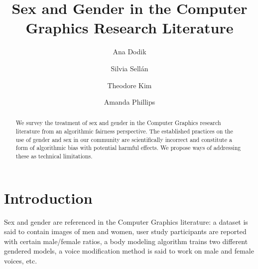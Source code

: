 \documentclass[nonacm,sigconf,review,balance=false]{acmart}
\begin{document}
\title{Sex and Gender in the Computer Graphics Research Literature}

\author{Ana Dodik}

\author{Silvia Sellán}\authornotemark[1]

\author{Theodore Kim}

\author{Amanda Phillips}



\begin{abstract}
    We survey the treatment of sex and gender in the Computer Graphics research
    literature from an algorithmic fairness perspective. The
    established practices on the use of gender and sex in our community are scientifically incorrect and constitute a
    form of algorithmic bias with potential harmful effects. We propose ways of addressing these as technical limitations.
\end{abstract}


\maketitle

\vspace{-0.1cm}
\section{Introduction}


Sex and gender are referenced in the Computer Graphics literature: a dataset is said to contain images of men and women, user study participants are reported with certain male/female ratios, a body modeling algorithm trains two different gendered models, a voice modification method is said to work on male and female voices, etc.



\end{document}
